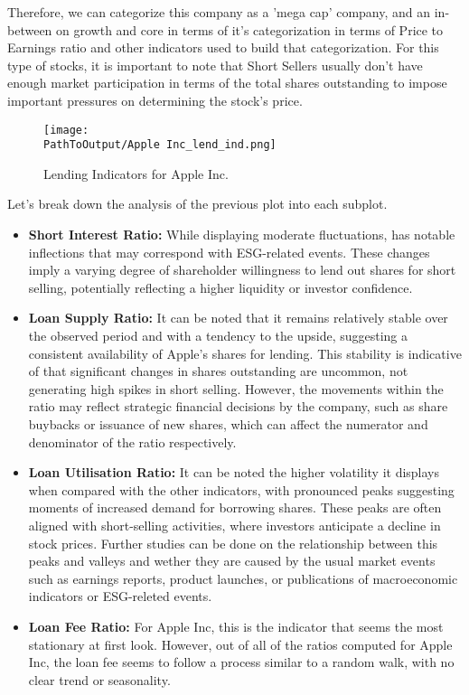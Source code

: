 Therefore, we can categorize this company as a 'mega cap' company, and an in-between on growth and core in terms of it's categorization in terms of Price to Earnings ratio and other indicators used to build that categorization. For this type of stocks, it is important to note that Short Sellers usually don't have enough market participation in terms of the total shares outstanding to impose important pressures on determining the stock's price.

\begin{figure}[H]
\centering
\caption{Lending Indicators for Apple Inc.}
  \centering
  \texttt{[image: \\PathToOutput/Apple Inc\_lend\_ind.png]}
\label{fig:apple_lending_indicators}
\end{figure}

Let's break down the analysis of the previous plot into each subplot.

\begin{itemize}
	\item\textbf{Short Interest Ratio:} While displaying moderate fluctuations, has notable inflections that may correspond with ESG-related events. These changes imply a varying degree of shareholder willingness to lend out shares for short selling, potentially reflecting a higher liquidity or investor confidence.
	\item\textbf{Loan Supply Ratio:} It can be noted that it remains relatively stable over the observed period and with a tendency to the upside, suggesting a consistent availability of Apple's shares for lending. This stability is indicative of that significant changes in shares outstanding are uncommon, not generating high spikes in short selling. However, the movements within the ratio may reflect strategic financial decisions by the company, such as share buybacks or issuance of new shares, which can affect the numerator and denominator of the ratio respectively.
	\item\textbf{Loan Utilisation Ratio:} It can be noted the higher volatility it displays when compared with the other indicators, with pronounced peaks suggesting moments of increased demand for borrowing shares. These peaks are often aligned with short-selling activities, where investors anticipate a decline in stock prices. Further studies can be done on the relationship between this peaks and valleys and wether they are caused by the usual market events such as earnings reports, product launches, or publications of macroeconomic indicators or ESG-releted events.
	\item\textbf{Loan Fee Ratio:} For Apple Inc, this is the indicator that seems the most stationary at first look. However, out of all of the ratios computed for Apple Inc, the loan fee seems to follow a process similar to a random walk, with no clear trend or seasonality.
\end{itemize}


